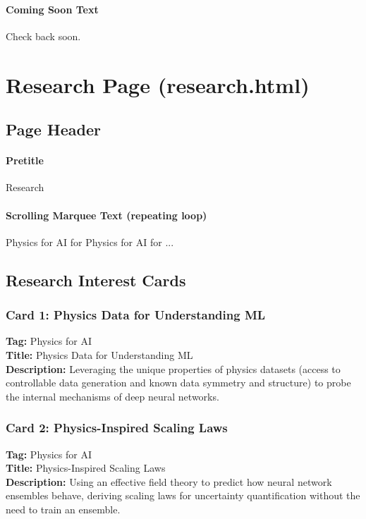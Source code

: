 \documentclass[11pt]{article}
\begin{document}
\paragraph{Coming Soon Text}
 Check back soon.


\section{Research Page (research.html)}

\subsection{Page Header}
\label{sec:research-header}

\paragraph{Pretitle}
Research

\paragraph{Scrolling Marquee Text (repeating loop)}
Physics for AI for Physics for AI for ...

\subsection{Research Interest Cards}
\label{sec:research-cards}

\subsubsection{Card 1: Physics Data for Understanding ML}
\label{sec:research-card1}
\textbf{Tag:} Physics for AI\\
\textbf{Title:} Physics Data for Understanding ML\\
\textbf{Description:} Leveraging the unique properties of physics datasets (access to controllable data generation and known data symmetry and structure) to probe the internal mechanisms of deep neural networks.

\subsubsection{Card 2: Physics-Inspired Scaling Laws}
\label{sec:research-card2}
\textbf{Tag:} Physics for AI\\
\textbf{Title:} Physics-Inspired Scaling Laws\\
\textbf{Description:} Using an effective field theory to predict how neural network ensembles behave, deriving scaling laws for uncertainty quantification without the need to train an ensemble.
\end{document}
